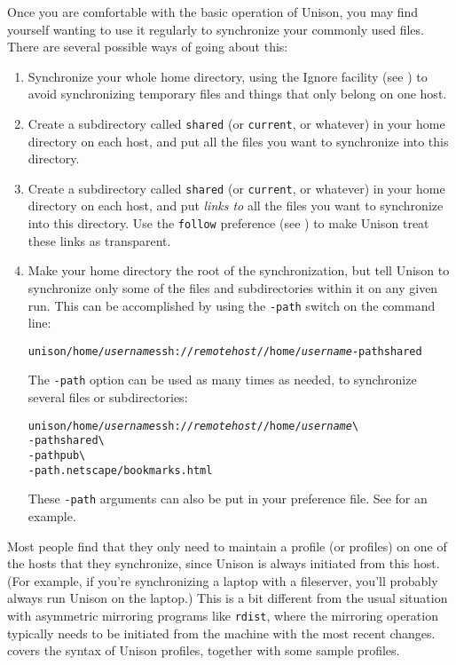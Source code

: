 \documentclass{article}
\newcommand{\NT}[1]{\textit{#1}}
\begin{document}

Once you are comfortable with the basic operation of Unison, you may
find yourself wanting to use it regularly to synchronize your commonly
used files.  There are several possible ways of going about this:

\begin{enumerate}
\item Synchronize your whole home directory, using the Ignore facility
(see )
to avoid synchronizing temporary files and things that only belong on
one host.
\item Create a subdirectory called {\tt shared} (or {\tt current}, or
whatever) in your home directory on each host, and put all the files
you want to synchronize into this directory.  
\item Create a subdirectory called {\tt shared} (or {\tt current}, or
whatever) in your home directory on each host, and put {\em links to}
all the files you want to synchronize into this directory.  Use the
{\tt follow} preference (see ) to make
Unison treat these links as transparent.
\item Make your home directory the root of the synchronization, but
tell Unison to synchronize only some of the files and subdirectories
within it on any given run.  This can be accomplished by using the {\tt -path} switch
on the command line:
\begin{alltt}
       unison /home/\NT{username} ssh://\NT{remotehost}//home/\NT{username} -path shared
\end{alltt}
The {\tt -path} option can be used as many times as needed, to 
synchronize several files or subdirectories:
\begin{alltt}
       unison /home/\NT{username} ssh://\NT{remotehost}//home/\NT{username} \verb|\|
          -path shared \verb|\|
          -path pub \verb|\|
          -path .netscape/bookmarks.html
\end{alltt}
These \verb|-path| arguments can also be put in your preference file.
See  for an example.
\end{enumerate}

Most people find that they only need to maintain a profile (or
profiles) on one of the hosts that they synchronize, since Unison is
always initiated from this host.  (For example, if you're
synchronizing a laptop with a fileserver, you'll probably always run
Unison on the laptop.)  This is a bit different from the usual
situation with asymmetric mirroring programs like \verb|rdist|, where
the mirroring operation typically needs to be initiated from the
machine with the most recent changes.  
covers the syntax of Unison profiles, together with some sample profiles.
\end{document}
